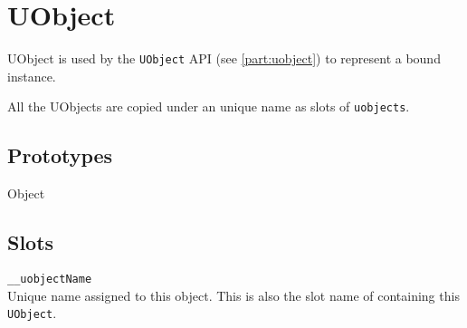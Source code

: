 \section{UObject}

UObject is used by the \lstinline|UObject| API (see
\autoref{part:uobject}) to represent a bound \Cxx instance.

All the UObjects are copied under an unique name as slots of
\lstinline{uobjects}.

\subsection{Prototypes}
\begin{refObjects}
\item[Object]
\end{refObjects}

\subsection{Slots}

\begin{urbiscriptapi}
\item \lstinline|__uobjectName| \\
  Unique name assigned to this object. This is also the slot name of
   containing this \lstinline|UObject|.
\end{urbiscriptapi}


